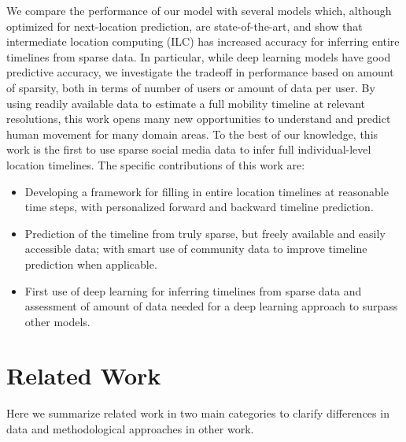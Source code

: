 We compare the performance of our model with several models which, although optimized for next-location prediction, are state-of-the-art, and show that intermediate location computing (ILC) has increased accuracy for inferring entire timelines from sparse data. In particular, while deep learning models have good predictive accuracy, we investigate the tradeoff in performance based on amount of sparsity, both in terms of number of users or amount of data per user. By using readily available data to estimate a full mobility timeline at relevant resolutions, this work opens many new opportunities to understand and predict human movement for many domain areas. To the best of our knowledge, this work is the first to use sparse social media data to infer full individual-level location timelines. The specific contributions of this work are:
\begin{itemize}
    \item Developing a framework for filling in entire location timelines at reasonable time steps, with personalized forward and backward timeline prediction.
    \item Prediction of the timeline from truly sparse, but freely available and easily accessible data; with smart use of community data to improve timeline prediction when applicable.
    \item First use of deep learning for inferring timelines from sparse data and assessment of amount of data needed for a deep learning approach to surpass other models.
\end{itemize}


\section{Related Work}
Here we summarize related work in two main categories to clarify differences in data and methodological approaches in other work.
